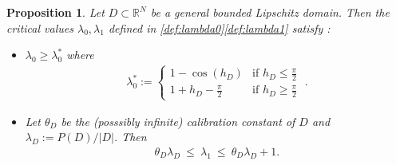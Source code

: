 \documentclass[reqno,11pt]{amsart}
\newtheorem{proposition}[theorem]{Proposition}
\theoremstyle{definition}
\newtheorem{remark}[theorem]{Remark}
\numberwithin{equation}{section}
\def\R{\mathbb{R}}
\newcommand{\1}{{{\bf 1}\kern-0,28em\rm l}}
\newcommand{\one}{{{\bf 1}\kern-0,28em\rm l}}
\def\O{\Omega}
\def\l{\lambda}
\begin{document}
%
%
%
%






\begin{proposition}\label{estim2} Let $D\subset \R^N$ be a general bounded Lipschitz domain. Then the critical values $\l_0,\l_1$ defined in \eqref{def:lambda0}\eqref{def:lambda1} satisfy
:
\begin{itemize}
\item[(i)] $\lambda_0 \ge \lambda_0^* $  where 
\begin{align}
\lambda_0^* := \begin{cases}
 1- \cos(h_D) & \text{if $h_D\le \frac{\pi}{2}$}\\
1 + h_D-\frac{\pi}{2} & \text{if $h_D\ge \frac{\pi}{2}$}
\end{cases}\; . \label{l0star}
\end{align}
\item[(ii)] Let $\theta_D$ be the (posssibly infinite) calibration constant of $D$ and $\lambda_D :=P(D)/|D|$. Then
\begin{align}
\theta_D\lambda_D\ \le\ \lambda_1\ \le\ \theta_D\lambda_D + 1.\label{l1esti}
\end{align}
\end{itemize}
\end{proposition}
\end{document}
